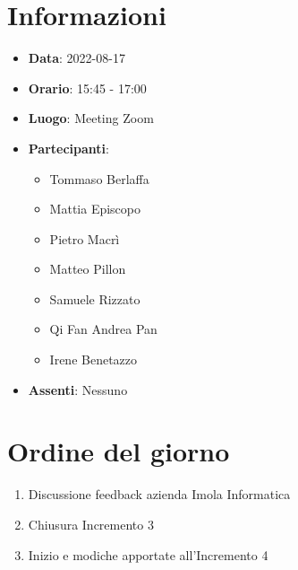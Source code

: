 \section{Informazioni}
	\begin{itemize}
		\item \textbf{Data}: 2022-08-17
		\item \textbf{Orario}: 15:45 - 17:00
		\item \textbf{Luogo}: Meeting Zoom
		\item \textbf{Partecipanti}:
		\begin{itemize}
			\item Tommaso Berlaffa
			\item Mattia Episcopo
			\item Pietro Macrì
			\item Matteo Pillon
			\item Samuele Rizzato
			\item Qi Fan Andrea Pan
			\item Irene Benetazzo
		\end{itemize}
        \item \textbf{Assenti}: Nessuno
	\end{itemize}
    
	\section{Ordine del giorno}
	\begin{enumerate}
		\item Discussione feedback azienda Imola Informatica 
		\item Chiusura Incremento 3
		\item Inizio e modiche apportate all'Incremento 4
	\end{enumerate}
	\newpage